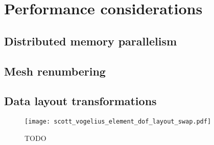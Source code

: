\documentclass[thesis]{subfiles}
\begin{document}
\section{Performance considerations}


\subsection{Distributed memory parallelism}



\subsection{Mesh renumbering}



\subsection{Data layout transformations}

\begin{figure}
  \centering
  \texttt{[image: scott\_vogelius\_element\_dof\_layout\_swap.pdf]}
  \caption{
    TODO
  }
  \label{fig:scott_vogelius_element_dof_layout_swap}
\end{figure}



\end{document}
